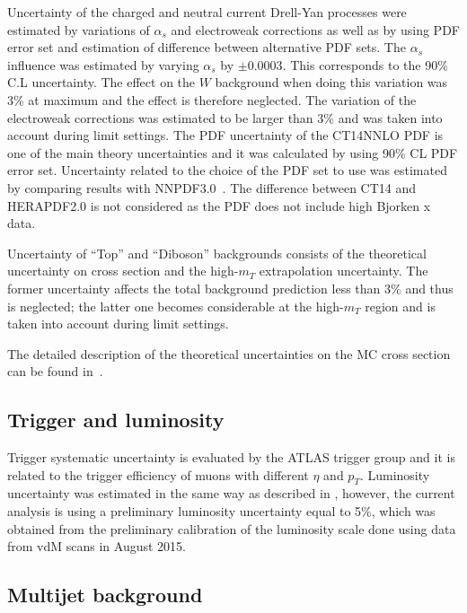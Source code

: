 Uncertainty of the charged and neutral current Drell-Yan processes were estimated by variations of $\alpha_s$ and electroweak corrections as well as by using PDF error set and estimation of difference between alternative PDF sets.
The $\alpha_s$ influence was estimated by varying $\alpha_s$ by $\pm 0.0003$. This corresponds to the 90\% C.L uncertainty. The effect on the $W$ background when doing this variation
was $3\%$ at maximum and the effect is therefore neglected. 
The variation of the electroweak corrections was estimated to be larger than $3\%$ and was
taken into account during limit settings.
The PDF uncertainty of the CT14NNLO PDF is one of the main theory uncertainties
and it was calculated by using 90$\%$ CL PDF error set.
Uncertainty related to the choice of the PDF set to use was estimated by comparing
results with NNPDF3.0~\cite{Ball:2014uwa}.
The difference between CT14 and HERAPDF2.0 is not considered as the PDF does not include high Bjorken x data. 

Uncertainty of ``Top'' and ``Diboson'' backgrounds consists of the theoretical uncertainty on cross section and the high-$m_T$ extrapolation uncertainty. The former uncertainty affects the total background
prediction less than 3$\%$ and thus is neglected; the latter one becomes considerable at the high-$m_T$ region and is taken into account during limit settings.

The detailed description of the theoretical uncertainties on the MC cross section can be found in~\cite{Aaboud:2016zkn}.

\subsection{Trigger and luminosity}
Trigger systematic uncertainty is evaluated by the ATLAS trigger group and it is related to the trigger
efficiency of muons with different $\eta$ and $p_T$.
Luminosity uncertainty was estimated in the same way as described in , however, the current analysis is using a preliminary luminosity
uncertainty equal to 5$\%$, which was obtained from the preliminary calibration of the luminosity scale done using data from vdM scans in August 2015.

\subsection{Multijet background}
\label{subsec:multijet_systematcs}

